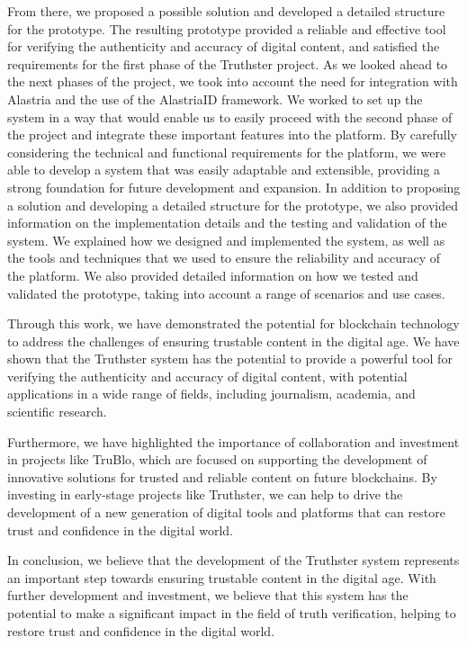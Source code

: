 \documentclass[target=mst,aauheader=]{thud}
\begin{document}
From there, we proposed a possible solution and developed a detailed structure for the prototype. The resulting prototype provided a reliable and effective tool for verifying the authenticity and accuracy of digital content, and satisfied the requirements for the first phase of the Truthster project. As we looked ahead to the next phases of the project, we took into account the need for integration with Alastria and the use of the AlastriaID framework. We worked to set up the system in a way that would enable us to easily proceed with the second phase of the project and integrate these important features into the platform. By carefully considering the technical and functional requirements for the platform, we were able to develop a system that was easily adaptable and extensible, providing a strong foundation for future development and expansion.
In addition to proposing a solution and developing a detailed structure for the prototype, we also provided information on the implementation details and the testing and validation of the system. We explained how we designed and implemented the system, as well as the tools and techniques that we used to ensure the reliability and accuracy of the platform. We also provided detailed information on how we tested and validated the prototype, taking into account a range of scenarios and use cases.


Through this work, we have demonstrated the potential for blockchain technology to address the challenges of ensuring trustable content in the digital age. We have shown that the Truthster system has the potential to provide a powerful tool for verifying the authenticity and accuracy of digital content, with potential applications in a wide range of fields, including journalism, academia, and scientific research.

Furthermore, we have highlighted the importance of collaboration and investment in projects like TruBlo, which are focused on supporting the development of innovative solutions for trusted and reliable content on future blockchains. By investing in early-stage projects like Truthster, we can help to drive the development of a new generation of digital tools and platforms that can restore trust and confidence in the digital world.

In conclusion, we believe that the development of the Truthster system represents an important step towards ensuring trustable content in the digital age. With further development and investment, we believe that this system has the potential to make a significant impact in the field of truth verification, helping to restore trust and confidence in the digital world.
\end{document}
